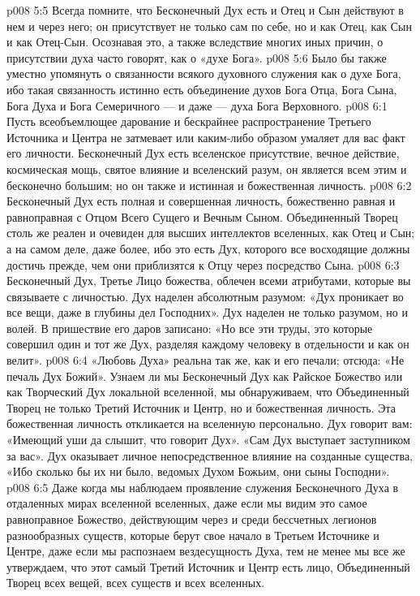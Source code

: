 \vs p008 5:5 Всегда помните, что Бесконечный Дух есть    и Отец и Сын действуют в нем и через него; он присутствует не только сам по себе, но и как Отец, как Сын и как Отец\hyp{}Сын. Осознавая это, а также вследствие многих иных причин, о присутствии духа часто говорят, как о «духе Бога».
\vs p008 5:6 Было бы также уместно упомянуть о связанности всякого духовного служения как о духе Бога, ибо такая связанность истинно есть объединение духов Бога Отца, Бога Сына, Бога Духа и Бога Семеричного --- и даже --- духа Бога Верховного.
\vs p008 6:1 Пусть всеобъемлющее дарование и бескрайнее распространение Третьего Источника и Центра не затмевает или каким\hyp{}либо образом умаляет для вас факт его личности. Бесконечный Дух есть вселенское присутствие, вечное действие, космическая мощь, святое влияние и вселенский разум, он является всем этим и бесконечно большим; но он также и истинная и божественная личность.
\vs p008 6:2 Бесконечный Дух есть полная и совершенная личность, божественно равная и равноправная с Отцом Всего Сущего и Вечным Сыном. Объединенный Творец столь же реален и очевиден для высших интеллектов вселенных, как Отец и Сын; а на самом деле, даже более, ибо это есть Дух, которого все восходящие должны достичь прежде, чем они приблизятся к Отцу через посредство Сына.
\vs p008 6:3 Бесконечный Дух, Третье Лицо божества, облечен всеми атрибутами, которые вы связываете с личностью. Дух наделен абсолютным разумом: «Дух проникает во все вещи, даже в глубины дел Господних». Дух наделен не только разумом, но и волей. В пришествие его даров записано: «Но все эти труды, это которые совершил один и тот же Дух, разделяя каждому человеку в отдельности и как он велит».
\vs p008 6:4 «Любовь Духа» реальна так же, как и его печали; отсюда: «Не печаль Дух Божий». Узнаем ли мы Бесконечный Дух как Райское Божество или как Творческий Дух локальной вселенной, мы обнаруживаем, что Объединенный Творец не только Третий Источник и Центр, но и божественная личность. Эта божественная личность откликается на вселенную персонально. Дух говорит вам: «Имеющий уши да слышит, что говорит Дух». «Сам Дух выступает заступником за вас». Дух оказывает личное непосредственное влияние на созданные существа, «Ибо сколько бы их ни было, ведомых Духом Божьим, они сыны Господни».
\vs p008 6:5 Даже когда мы наблюдаем проявление служения Бесконечного Духа в отдаленных мирах вселенной вселенных, даже если мы видим это самое равноправное Божество, действующим через и среди бессчетных легионов разнообразных существ, которые берут свое начало в Третьем Источнике и Центре, даже если мы распознаем вездесущность Духа, тем не менее мы все же утверждаем, что этот самый Третий Источник и Центр есть лицо, Объединенный Творец всех вещей, всех существ и всех вселенных.
